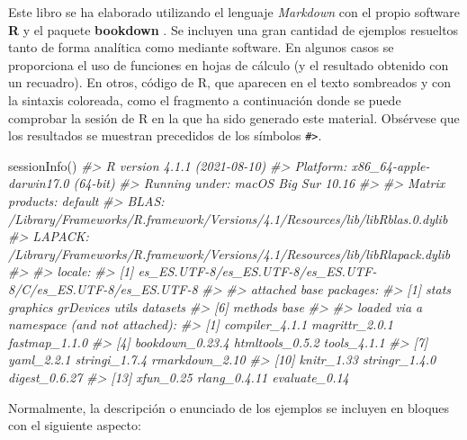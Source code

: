 \documentclass[
]{book}
\newenvironment{Shaded}{\begin{snugshade}}{\end{snugshade}}
\newcommand{\CommentTok}[1]{\textcolor[rgb]{0.56,0.35,0.01}{\textit{#1}}}
\newcommand{\FunctionTok}[1]{\textcolor[rgb]{0.00,0.00,0.00}{#1}}
\newcommand{\NormalTok}[1]{#1}
\begin{document}
Este libro se ha elaborado utilizando el lenguaje \emph{Markdown} con el propio
software \textbf{R} y el paquete \textbf{bookdown} \citep{R-bookdown}.
Se incluyen una gran cantidad de ejemplos resueltos tanto de forma analítica
como mediante software. En algunos casos se proporciona el uso de funciones
en hojas de cálculo (y el resultado obtenido con un recuadro).
En otros, código de R, que aparecen en el texto
sombreados y con la sintaxis coloreada, como el fragmento a continuación
donde se puede comprobar la sesión de R en la que ha sido generado este material.
Obsérvese que los resultados se muestran precedidos de los símbolos
\texttt{\#\textgreater{}}.

\begin{Shaded}
\begin{Highlighting}[]
\FunctionTok{sessionInfo}\NormalTok{()}
\CommentTok{\#\textgreater{} R version 4.1.1 (2021{-}08{-}10)}
\CommentTok{\#\textgreater{} Platform: x86\_64{-}apple{-}darwin17.0 (64{-}bit)}
\CommentTok{\#\textgreater{} Running under: macOS Big Sur 10.16}
\CommentTok{\#\textgreater{} }
\CommentTok{\#\textgreater{} Matrix products: default}
\CommentTok{\#\textgreater{} BLAS:   /Library/Frameworks/R.framework/Versions/4.1/Resources/lib/libRblas.0.dylib}
\CommentTok{\#\textgreater{} LAPACK: /Library/Frameworks/R.framework/Versions/4.1/Resources/lib/libRlapack.dylib}
\CommentTok{\#\textgreater{} }
\CommentTok{\#\textgreater{} locale:}
\CommentTok{\#\textgreater{} [1] es\_ES.UTF{-}8/es\_ES.UTF{-}8/es\_ES.UTF{-}8/C/es\_ES.UTF{-}8/es\_ES.UTF{-}8}
\CommentTok{\#\textgreater{} }
\CommentTok{\#\textgreater{} attached base packages:}
\CommentTok{\#\textgreater{} [1] stats     graphics  grDevices utils     datasets }
\CommentTok{\#\textgreater{} [6] methods   base     }
\CommentTok{\#\textgreater{} }
\CommentTok{\#\textgreater{} loaded via a namespace (and not attached):}
\CommentTok{\#\textgreater{}  [1] compiler\_4.1.1  magrittr\_2.0.1  fastmap\_1.1.0  }
\CommentTok{\#\textgreater{}  [4] bookdown\_0.23.4 htmltools\_0.5.2 tools\_4.1.1    }
\CommentTok{\#\textgreater{}  [7] yaml\_2.2.1      stringi\_1.7.4   rmarkdown\_2.10 }
\CommentTok{\#\textgreater{} [10] knitr\_1.33      stringr\_1.4.0   digest\_0.6.27  }
\CommentTok{\#\textgreater{} [13] xfun\_0.25       rlang\_0.4.11    evaluate\_0.14}
\end{Highlighting}
\end{Shaded}

Normalmente, la descripción o enunciado de los ejemplos se incluyen en bloques
con el siguiente aspecto:
\end{document}
